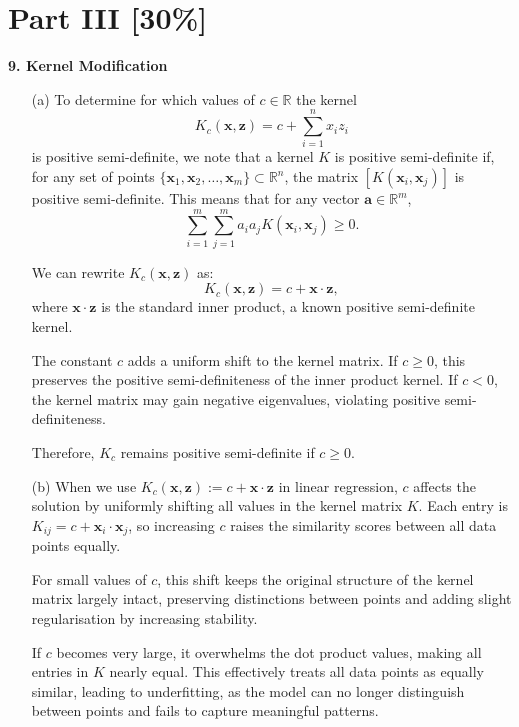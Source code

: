 \documentclass{article}
\begin{document}
\section*{Part III [30\%]}

\vspace{0.5cm}
\noindent\textbf{9. Kernel Modification}
\vspace{0.5cm}

\begin{itemize}
    \item[(a)] To determine for which values of \( c \in \mathbb{R} \) the kernel 
    \[
    K_c(\mathbf{x}, \mathbf{z}) = c + \sum_{i=1}^n x_i z_i
    \]
    is positive semi-definite, we note that a kernel \( K \) is positive semi-definite if, for any set of points \( \{ \mathbf{x}_1, \mathbf{x}_2, \dots, \mathbf{x}_m \} \subset \mathbb{R}^n \), the matrix \( [K(\mathbf{x}_i, \mathbf{x}_j)] \) is positive semi-definite. This means that for any vector \( \mathbf{a} \in \mathbb{R}^m \),
    \[
    \sum_{i=1}^m \sum_{j=1}^m a_i a_j K(\mathbf{x}_i, \mathbf{x}_j) \geq 0.
    \]

    We can rewrite \( K_c(\mathbf{x}, \mathbf{z}) \) as:
    \[
    K_c(\mathbf{x}, \mathbf{z}) = c + \mathbf{x} \cdot \mathbf{z},
    \]
    where \( \mathbf{x} \cdot \mathbf{z} \) is the standard inner product, a known positive semi-definite kernel.

    The constant \( c \) adds a uniform shift to the kernel matrix. If \( c \geq 0 \), this preserves the positive semi-definiteness of the inner product kernel. If \( c < 0 \), the kernel matrix may gain negative eigenvalues, violating positive semi-definiteness.

    Therefore, \( K_c \) remains positive semi-definite if \( c \geq 0 \).

    \item[(b)] When we use \( K_c(\mathbf{x}, \mathbf{z}) := c + \mathbf{x} \cdot \mathbf{z} \) in linear regression, \( c \) affects the solution by uniformly shifting all values in the kernel matrix \( K \). Each entry is \( K_{ij} = c + \mathbf{x}_i \cdot \mathbf{x}_j \), so increasing \( c \) raises the similarity scores between all data points equally.

    For small values of \( c \), this shift keeps the original structure of the kernel matrix largely intact, preserving distinctions between points and adding slight regularisation by increasing stability. 

    If \( c \) becomes very large, it overwhelms the dot product values, making all entries in \( K \) nearly equal. This effectively treats all data points as equally similar, leading to underfitting, as the model can no longer distinguish between points and fails to capture meaningful patterns.


\end{itemize}
\end{document}

